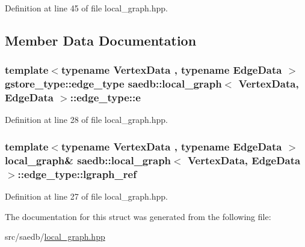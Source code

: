 Definition at line 45 of file local\-\_\-graph.\-hpp.



\subsection{Member Data Documentation}
\hypertarget{structsaedb_1_1local__graph_1_1edge__type_acb4410e19f8158ef74a2df433c104fea}{
\subsubsection[{e}]{\setlength{\rightskip}{0pt plus 5cm}template$<$typename Vertex\-Data , typename Edge\-Data $>$ {\bf gstore\-\_\-type\-::edge\-\_\-type} {\bf saedb\-::local\-\_\-graph}$<$ Vertex\-Data, Edge\-Data $>$\-::edge\-\_\-type\-::e}}\label{da/d9c/structsaedb_1_1local__graph_1_1edge__type_acb4410e19f8158ef74a2df433c104fea}


Definition at line 28 of file local\-\_\-graph.\-hpp.

\hypertarget{structsaedb_1_1local__graph_1_1edge__type_a10710816a9c91ab177cdcbdc1b02c13b}{
\subsubsection[{lgraph\-\_\-ref}]{\setlength{\rightskip}{0pt plus 5cm}template$<$typename Vertex\-Data , typename Edge\-Data $>$ {\bf local\-\_\-graph}\& {\bf saedb\-::local\-\_\-graph}$<$ Vertex\-Data, Edge\-Data $>$\-::edge\-\_\-type\-::lgraph\-\_\-ref}}\label{da/d9c/structsaedb_1_1local__graph_1_1edge__type_a10710816a9c91ab177cdcbdc1b02c13b}


Definition at line 27 of file local\-\_\-graph.\-hpp.



The documentation for this struct was generated from the following file\-:\begin{DoxyCompactItemize}
\item 
src/saedb/\hyperlink{local__graph_8hpp}{local\-\_\-graph.\-hpp}\end{DoxyCompactItemize}
